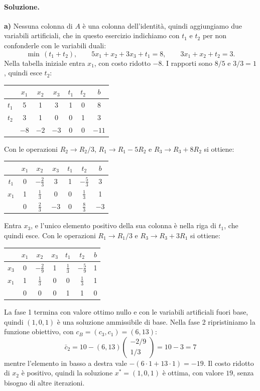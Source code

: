 \paragraph{Soluzione.}
\textbf{a)} Nessuna colonna di $A$ è una colonna dell'identità, quindi aggiungiamo due variabili artificiali, che in questo esercizio indichiamo con $t_1$ e $t_2$ per non confonderle con le variabili duali:
\[
\min\, (t_1 + t_2), \qquad 5x_1 + x_2 + 3x_3 + t_1 = 8, \qquad 3x_1 + x_2 + t_2 = 3.
\]
Nella tabella iniziale entra $x_1$, con costo ridotto $-8$. I rapporti sono $8/5$ e $3/3 = 1$, quindi esce $t_2$:
\begin{center}
\begin{tabular}{c|ccccc|c}
 & $x_1$ & $x_2$ & $x_3$ & $t_1$ & $t_2$ & $b$ \\
\hline
$t_1$ & 5 & 1 & 3 & 1 & 0 & 8 \\
$t_2$ & $\boxed{3}$ & 1 & 0 & 0 & 1 & 3 \\
\hline
 & $-8$ & $-2$ & $-3$ & 0 & 0 & $-11$ \\
\end{tabular}
\end{center}
Con le operazioni $R_2 \to R_2/3$, $R_1 \to R_1 - 5R_2$ e $R_3 \to R_3 + 8R_2$ si ottiene:
\begin{center}
\begin{tabular}{c|ccccc|c}
 & $x_1$ & $x_2$ & $x_3$ & $t_1$ & $t_2$ & $b$ \\
\hline
$t_1$ & 0 & $-\frac23$ & $\boxed{3}$ & 1 & $-\frac53$ & 3 \\
$x_1$ & 1 & $\frac13$ & 0 & 0 & $\frac13$ & 1 \\
\hline
 & 0 & $\frac23$ & $-3$ & 0 & $\frac83$ & $-3$ \\
\end{tabular}
\end{center}
Entra $x_3$, e l'unico elemento positivo della sua colonna è nella riga di $t_1$, che quindi esce. Con le operazioni $R_1 \to R_1/3$ e $R_3 \to R_3 + 3R_1$ si ottiene:
\begin{center}
\begin{tabular}{c|ccccc|c}
 & $x_1$ & $x_2$ & $x_3$ & $t_1$ & $t_2$ & $b$ \\
\hline
$x_3$ & 0 & $-\frac29$ & 1 & $\frac13$ & $-\frac59$ & 1 \\
$x_1$ & 1 & $\frac13$ & 0 & 0 & $\frac13$ & 1 \\
\hline
 & 0 & 0 & 0 & 1 & 1 & 0 \\
\end{tabular}
\end{center}
La fase 1 termina con valore ottimo nullo e con le variabili artificiali fuori base, quindi $(1, 0, 1)$ è una soluzione ammissibile di base. Nella fase 2 ripristiniamo la funzione obiettivo, con $c_B = (c_3, c_1) = (6, 13)$:
\[
\bar{c}_2 = 10 - (6, 13) \begin{pmatrix} -2/9 \\ 1/3 \end{pmatrix} = 10 - 3 = 7
\]
mentre l'elemento in basso a destra vale $-(6 \cdot 1 + 13 \cdot 1) = -19$. Il costo ridotto di $x_2$ è positivo, quindi la soluzione $x^* = (1, 0, 1)$ è ottima, con valore $19$, senza bisogno di altre iterazioni.

